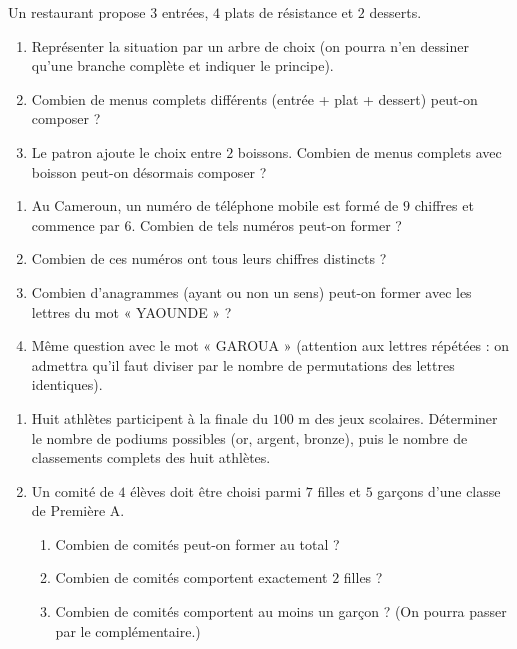 \documentclass[11pt]{article}
\begin{document}
\begin{exercice}
Un restaurant propose $3$ entrées, $4$ plats de résistance et $2$ desserts.
\begin{enumerate}
\item Représenter la situation par un arbre de choix (on pourra n'en dessiner qu'une branche complète et indiquer le principe).
\item Combien de menus complets différents (entrée + plat + dessert) peut-on composer ?
\item Le patron ajoute le choix entre $2$ boissons. Combien de menus complets avec boisson peut-on désormais composer ?
\end{enumerate}
\end{exercice}

\begin{exercice}
\begin{enumerate}
\item Au Cameroun, un numéro de téléphone mobile est formé de $9$ chiffres et commence par $6$. Combien de tels numéros peut-on former ?
\item Combien de ces numéros ont tous leurs chiffres distincts ?
\item Combien d'anagrammes (ayant ou non un sens) peut-on former avec les lettres du mot « YAOUNDE » ?
\item Même question avec le mot « GAROUA » (attention aux lettres répétées : on admettra qu'il faut diviser par le nombre de permutations des lettres identiques).
\end{enumerate}
\end{exercice}

\begin{exercice}
\begin{enumerate}
\item Huit athlètes participent à la finale du $100$ m des jeux scolaires. Déterminer le nombre de podiums possibles (or, argent, bronze), puis le nombre de classements complets des huit athlètes.
\item Un comité de $4$ élèves doit être choisi parmi $7$ filles et $5$ garçons d'une classe de Première A.
\begin{enumerate}
\item Combien de comités peut-on former au total ?
\item Combien de comités comportent exactement $2$ filles ?
\item Combien de comités comportent au moins un garçon ? (On pourra passer par le complémentaire.)
\end{enumerate}
\end{enumerate}
\end{exercice}
\end{document}
